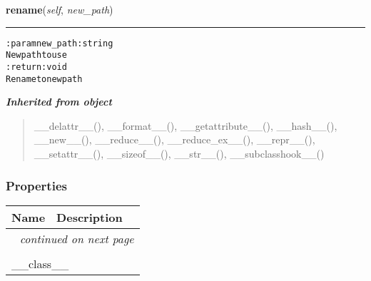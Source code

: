     \label{hal:files:models:FileSystem:rename}

    \vspace{0.5ex}

\hspace{.8\funcindent}\begin{boxedminipage}{\funcwidth}

    \raggedright \textbf{rename}(\textit{self}, \textit{new\_path})

    \vspace{-1.5ex}

    \rule{\textwidth}{0.5\fboxrule}
\setlength{\parskip}{2ex}
\begin{alltt}

:param new\_path: string
    New path to use
:return: void
    Rename to new path
\end{alltt}

\setlength{\parskip}{1ex}
    \end{boxedminipage}


\large{\textbf{\textit{Inherited from object}}}

\begin{quote}
\_\_delattr\_\_(), \_\_format\_\_(), \_\_getattribute\_\_(), \_\_hash\_\_(), \_\_new\_\_(), \_\_reduce\_\_(), \_\_reduce\_ex\_\_(), \_\_repr\_\_(), \_\_setattr\_\_(), \_\_sizeof\_\_(), \_\_str\_\_(), \_\_subclasshook\_\_()
\end{quote}


  \subsubsection{Properties}

    \vspace{-1cm}
\hspace{\varindent}\begin{longtable}{|p{\varnamewidth}|p{\vardescrwidth}|l}
\cline{1-2}
\cline{1-2} \centering \textbf{Name} & \centering \textbf{Description}& \\
\cline{1-2}
\endhead\cline{1-2}\multicolumn{3}{r}{\small\textit{continued on next page}}\\\endfoot\cline{1-2}
\endlastfoot\multicolumn{2}{|l|}{\textit{Inherited from object}}\\
\multicolumn{2}{|p{\varwidth}|}{\raggedright \_\_class\_\_}\\
\cline{1-2}
\end{longtable}

